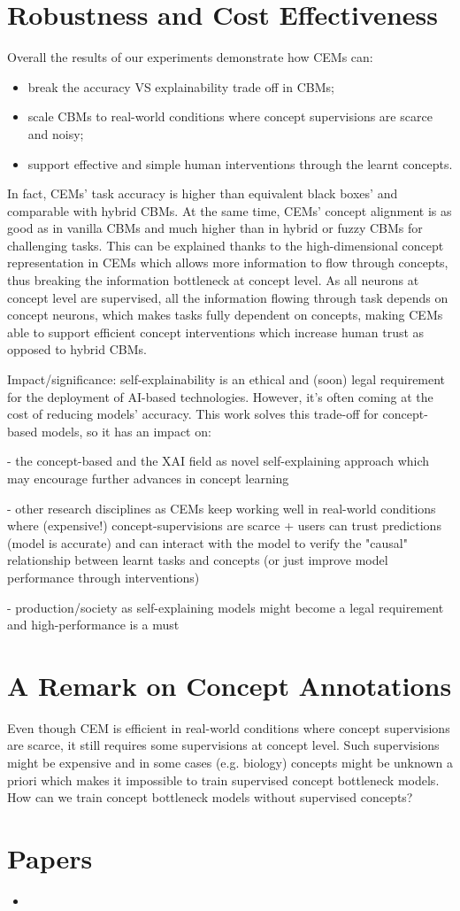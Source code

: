 \section{Robustness and Cost Effectiveness}
Overall the results of our experiments demonstrate how CEMs can:
\begin{itemize}
	\item break the accuracy VS explainability trade off in CBMs;
	\item scale CBMs to real-world conditions where concept supervisions are scarce and noisy;
	\item support effective and simple human interventions through the learnt concepts.
\end{itemize}
In fact, CEMs' task accuracy is higher than equivalent black boxes' and comparable with hybrid CBMs. At the same time, CEMs' concept alignment is as good as in vanilla CBMs and much higher than in hybrid or fuzzy CBMs for challenging tasks. This can be explained thanks to the high-dimensional concept representation in CEMs which allows more information to flow through concepts, thus breaking the information bottleneck at concept level. As all neurons at concept level are supervised, all the information flowing through task depends on concept neurons, which makes tasks fully dependent on concepts, making CEMs able to support efficient concept interventions which increase human trust as opposed to hybrid CBMs.



Impact/significance: self-explainability is an ethical and (soon) legal requirement for the deployment of AI-based technologies. However, it's often coming at the cost of reducing models' accuracy. This work solves this trade-off for concept-based models, so it has an impact on:

- the concept-based and the XAI field as novel self-explaining approach which may encourage further advances in concept learning

- other research disciplines as CEMs keep working well in real-world conditions where (expensive!) concept-supervisions are scarce + users can trust predictions (model is accurate) and can interact with the model to verify the "causal" relationship between learnt tasks and concepts (or just improve model performance through interventions)

- production/society as self-explaining models might become a legal requirement and high-performance is a must

\section{A Remark on Concept Annotations}
Even though CEM is efficient in real-world conditions where concept supervisions are scarce, it still requires some supervisions at concept level. Such supervisions might be expensive and in some cases (e.g. biology) concepts might be unknown a priori which makes it impossible to train supervised concept bottleneck models. How can we train concept bottleneck models without supervised concepts?


\section*{Papers}
\nobibliography*
\begin{itemize}
    \item {}
\end{itemize}
